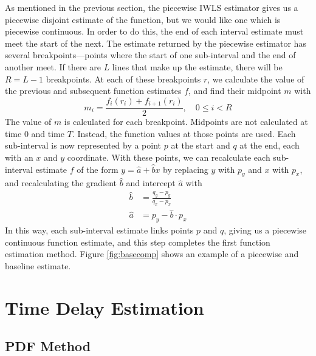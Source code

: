 \documentclass[a4paper,11pt]{article}
\begin{document}
    As mentioned in the previous section, the piecewise IWLS estimator gives us
    a piecewise disjoint estimate of the function, but we would like one which
    is piecewise continuous. In order to do this, the end of each interval
    estimate must meet the start of the next. The estimate returned by the
    piecewise estimator has several breakpoints---points where the start of one
    sub-interval and the end of another meet. If there are $L$ lines that make
    up the estimate, there will be $R=L-1$ breakpoints. At each of these
    breakpoints $r$, we calculate the value of the previous and subsequent
    function estimates $f$, and find their midpoint $m$ with
    \begin{equation}
    m_i = \frac{f_{i}(r_i) + f_{i+1}(r_i)}{2},\quad 0\leq i < R
    \end{equation}
    The value of $m$ is calculated for each breakpoint. Midpoints are not
    calculated at time 0 and time $T$. Instead, the function values at those
    points are used. Each sub-interval is now represented by a point $p$ at the
    start and $q$ at the end, each with an $x$ and $y$ coordinate. With these
    points, we can recalculate each sub-interval estimate $f$ of the form
    $y=\hat{a}+\hat{b}x$ by replacing $y$ with $p_y$ and $x$ with $p_x$, and
    recalculating the gradient $\hat{b}$ and intercept $\hat{a}$ with
    \begin{align}
    \hat{b} &= \frac{q_y-p_y}{q_x-p_x}\\
    \hat{a} &= p_y - \hat{b}\cdot p_x
    \end{align}
    In this way, each sub-interval estimate links points $p$ and $q$, giving us
    a piecewise continuous function estimate, and this step completes the first
    function estimation method. Figure \ref{fig:basecomp} shows an example of a
    piecewise and baseline estimate.
\section{Time Delay Estimation}
\label{sec-5}
\subsection{PDF Method}
\label{sec-5-1}
\end{document}

